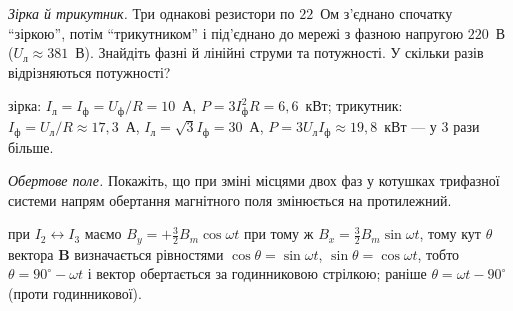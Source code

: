 \begin{problem}\label{prb:StarDelta}
	\emph{Зірка й трикутник.} Три однакові резистори по $22$~Ом з'єднано спочатку \enquote{зіркою}, потім \enquote{трикутником} і під'єднано до мережі з фазною напругою $220$~В ($U_\text{л}\approx381$~В). Знайдіть фазні й лінійні струми та потужності. У скільки разів відрізняються потужності?
	\begin{solution}
		зірка: $I_\text{л}=I_\text{ф}=U_\text{ф}/R=10$~А, $P=3I_\text{ф}^2R=6{,}6$~кВт; трикутник: $I_\text{ф}=U_\text{л}/R\approx17{,}3$~А, $I_\text{л}=\sqrt3I_\text{ф}=30$~А, $P=3U_\text{л}I_\text{ф}\approx19{,}8$~кВт --- у $3$ рази більше.
	\end{solution}
\end{problem}

\begin{problem}\label{prb:RotatingField}
	\emph{Обертове поле.} Покажіть, що при зміні місцями двох фаз у котушках трифазної системи напрям обертання магнітного поля змінюється на протилежний.
	\begin{solution}
		при $I_2\leftrightarrow I_3$ маємо $B_y=+\frac32B_m\cos\omega t$ при тому ж $B_x=\frac32B_m\sin\omega t$, тому кут $\theta$ вектора $\mathbf{B}$ визначається рівностями $\cos\theta=\sin\omega t$, $\sin\theta=\cos\omega t$, тобто $\theta=90^\circ-\omega t$ і вектор обертається за годинниковою стрілкою; раніше $\theta=\omega t-90^\circ$ (проти годинникової).
	\end{solution}
\end{problem}
\endgroup


